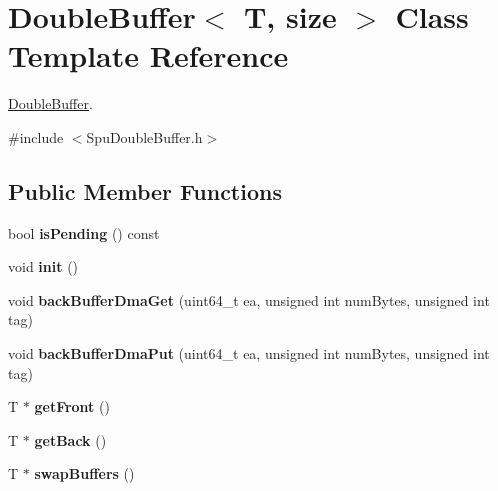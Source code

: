 \hypertarget{class_double_buffer}{\section{Double\+Buffer$<$ T, size $>$ Class Template Reference}
\label{class_double_buffer}
}


\hyperlink{class_double_buffer}{Double\+Buffer}.  




{\ttfamily \#include $<$Spu\+Double\+Buffer.\+h$>$}

\subsection*{Public Member Functions}
\begin{DoxyCompactItemize}
\item 
\hypertarget{class_double_buffer_a9d4fc331df3517be3887078d66d687c8}{bool {\bfseries is\+Pending} () const }\label{class_double_buffer_a9d4fc331df3517be3887078d66d687c8}

\item 
\hypertarget{class_double_buffer_a2e55ca9c30cc6e8520ddf00d703da8e9}{void {\bfseries init} ()}\label{class_double_buffer_a2e55ca9c30cc6e8520ddf00d703da8e9}

\item 
\hypertarget{class_double_buffer_a85edf900d1585b1454e4759239dcd487}{void {\bfseries back\+Buffer\+Dma\+Get} (uint64\+\_\+t ea, unsigned int num\+Bytes, unsigned int tag)}\label{class_double_buffer_a85edf900d1585b1454e4759239dcd487}

\item 
\hypertarget{class_double_buffer_a44bd5f04a1167e7940f06a0886267cbc}{void {\bfseries back\+Buffer\+Dma\+Put} (uint64\+\_\+t ea, unsigned int num\+Bytes, unsigned int tag)}\label{class_double_buffer_a44bd5f04a1167e7940f06a0886267cbc}

\item 
\hypertarget{class_double_buffer_a0cd355ac290ae18f8fbaaad35af7c958}{T $\ast$ {\bfseries get\+Front} ()}\label{class_double_buffer_a0cd355ac290ae18f8fbaaad35af7c958}

\item 
\hypertarget{class_double_buffer_a201455b0ab67f953c544dd55b72e7527}{T $\ast$ {\bfseries get\+Back} ()}\label{class_double_buffer_a201455b0ab67f953c544dd55b72e7527}

\item 
\hypertarget{class_double_buffer_a06fe8a51a32d791c8589669593291a6c}{T $\ast$ {\bfseries swap\+Buffers} ()}\label{class_double_buffer_a06fe8a51a32d791c8589669593291a6c}

\end{DoxyCompactItemize}


